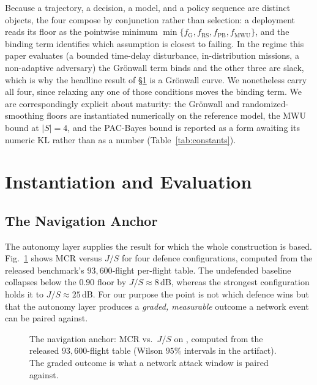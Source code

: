Because a trajectory, a decision, a model, and a policy sequence are distinct
objects, the four compose by conjunction rather than selection: a deployment
reads its floor as the pointwise minimum
$\min\{f_{\mathrm{G}},f_{\mathrm{RS}},f_{\mathrm{PB}},f_{\mathrm{MWU}}\}$, and
the binding term identifies which assumption is closest to failing. In the
regime this paper evaluates (a bounded time-delay disturbance, in-distribution
missions, a non-adaptive adversary) the Gr\"onwall term binds and the other
three are slack, which is why the headline result of \S\ref{sec:eval} is a
Gr\"onwall curve. We nonetheless carry all four, since relaxing any one of those
conditions moves the binding term. We are correspondingly explicit about
maturity: the Gr\"onwall and randomized-smoothing floors are instantiated
numerically on the reference model, the MWU bound at $|S|=4$, and the PAC-Bayes
bound is reported as a form awaiting its numeric $\mathrm{KL}$ rather than as a
number (Table~\ref{tab:constants}).

\section{Instantiation and Evaluation}
\label{sec:eval}
\subsection{The Navigation Anchor}
The autonomy layer supplies the result for which the whole construction is based.
Fig.~\ref{fig:mcr} shows MCR versus $J/S$ for four defence configurations,
computed from the released benchmark's $93{,}600$-flight per-flight table. The
undefended baseline collapses below the $0.90$ floor by $J/S\!\approx\!8$\,dB,
whereas the strongest configuration holds it to $J/S\!\approx\!25$\,dB. For our
purpose the point is not which defence wins but that the autonomy layer produces
a \emph{graded, measurable} outcome a network event can be paired against.

\begin{figure}[t]
\centering
{}
\caption{The navigation anchor: MCR vs.\ $J/S$ on ,
computed from the released $93{,}600$-flight table (Wilson $95\%$ intervals in
the artifact). The graded outcome is what a network attack window is paired
against.}
\label{fig:mcr}
\end{figure}

